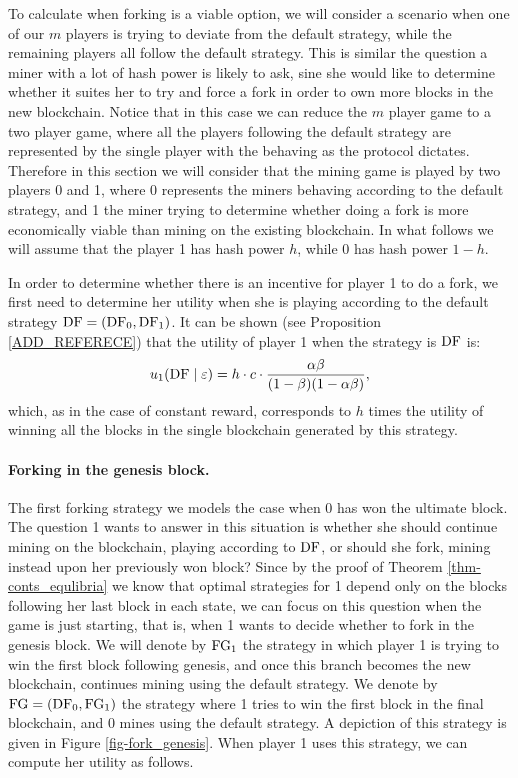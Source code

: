 To calculate when forking is a viable option, we will consider a scenario when one of our $m$ players is trying to deviate from the default strategy, while the remaining players all follow the default strategy. This is similar the question a miner with a lot of hash power is likely to ask, sine she would like to determine whether it suites her to try and force a fork in order to own more blocks in the new blockchain. Notice that in this case we can reduce the $m$ player game to a two player game, where all the players following the default strategy are represented by the single player with the behaving as the protocol dictates. Therefore  in this section we will consider that the mining game is played by two players 0 and 1, where 0 represents the miners behaving according to the default strategy, and 1 the miner trying to determine whether doing a fork is more economically viable than mining on the existing blockchain. In what follows we will assume that the player 1 has hash power $h$, while 0 has hash power $1-h$.

In order to determine whether there is an incentive for player 1 to do a fork, we first need to determine her utility when she is playing according to the default strategy $\text{\rm DF} = (\text{\rm DF}_0,\text{\rm DF}_1)$. It can be shown (see Proposition \ref{ADD_REFERECE}) that the utility of player 1 when the strategy is $\text{\rm DF}$ is:
$$u_1(\text{\rm DF}\mid\varepsilon) = h\cdot c\cdot\frac{\alpha\beta}{(1-\beta)(1-\alpha\beta)},$$
which, as in the case of constant reward, corresponds to $h$ times the utility of winning all the blocks in the single blockchain generated by this strategy.


\paragraph{Forking in the genesis block.}
The first forking strategy we models the case when 0 has won the ultimate block. The question 1 wants to answer in this situation is whether she should continue mining on the blockchain, playing according to $\text{\rm DF}$, or should she fork, mining instead upon her previously won block? Since by the proof of Theorem \ref{thm-conts_equlibria} we know that optimal strategies for 1 depend only on the blocks following her last block in each state, we can focus on this question when the game is just starting, that is, when 1 wants to decide whether to fork in the genesis block. We will denote by $\text{\rm FG}_1$ the strategy in which player 1 is trying to win the first block following genesis, and once this branch becomes the new blockchain, continues mining using the default strategy. We denote by $\text{\rm FG} = (\text{\rm DF}_0,\text{\rm FG}_1)$ the strategy where 1 tries to win the first block in the final blockchain, and 0 mines using the default strategy. A depiction of this strategy is given in Figure \ref{fig-fork_genesis}. When player 1 uses this strategy, we can compute her utility as follows.


